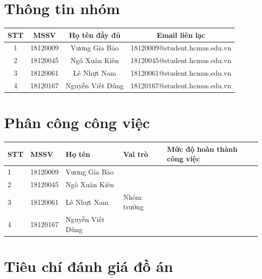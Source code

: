 \documentclass{article}
\newcommand\T{\rule{0pt}{2.6ex}}       %
\newcommand\B{\rule[-1.2ex]{0pt}{0pt}} %
\begin{document}
	\newpage
	\tableofcontents
	\newpage
	\setcounter{secnumdepth}{0}
	
	\section{Thông tin nhóm}
	\begin{center}
		\begin{tabular}{ | c | c | c | c |}\hline
			STT	& MSSV & Họ tên đầy đủ & Email liên lạc \T\B\\\hline
			1 & 18120009 & Vương Gia Bảo & 18120009@student.hcmus.edu.vn   \T\B\\ \hline
			2 & 18120045 & Ngô Xuân Kiên & 18120045@student.hcmus.edu.vn \T\B\\ \hline
			3 & 18120061 & Lê Nhựt Nam & 18120061@student.hcmus.edu.vn  \T\B\\ \hline
			4 & 18120167 & Nguyễn Viết Dũng &  18120167@student.hcmus.edu.vn \T\B\\ \hline
		\end{tabular}
	\end{center}
	\section{Phân công công việc}
	\begin{center}
		\begin{tabular}{ | l | l | l | p{3cm} | p{5cm} |}
			\hline
			STT & MSSV & Họ tên & Vai trò & Mức độ hoàn thành công việc  \T\B\\ \hline
			1 & 18120009 & Vương Gia Bảo & &  \T\B\\ \hline
			2 & 18120045 & Ngô Xuân Kiên & & \T\B \\ \hline
			3 & 18120061 & Lê Nhựt Nam & Nhóm trưởng &  \T\B \\ \hline
			4 & 18120167 & Nguyễn Viết Dũng &   &  \T\B \\ \hline
		\end{tabular}
	\end{center}
	\section{Tiêu chí đánh giá đồ án}
\end{document}
